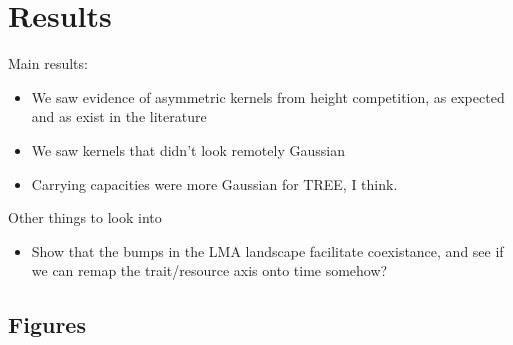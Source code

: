 \documentclass[a4paper,11pt]{article}
\begin{document}
\clearpage

\section{Results}

Main results:

\begin{itemize}
\item We saw evidence of asymmetric kernels from height competition,
  as expected and as exist in the literature
\item We saw kernels that didn't look remotely Gaussian
\item Carrying capacities were more Gaussian for TREE, I think.
\end{itemize}

Other things to look into

\begin{itemize}
\item Show that the bumps in the LMA landscape facilitate coexistance,
  and see if we can remap the trait/resource axis onto time somehow?
\end{itemize}

\subsection{Figures}
\end{document}
